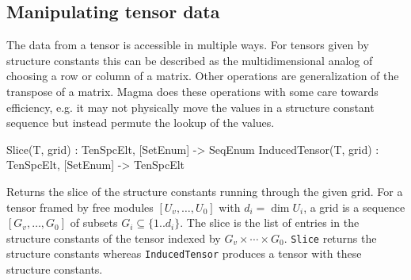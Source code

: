 \subsection{Manipulating tensor data}
The data from a tensor is accessible in multiple ways.   For 
tensors given by structure constants this can be described as the 
multidimensional analog of choosing a row or column of a matrix.
Other operations are generalization of the transpose of a matrix.
Magma does these operations with some care towards efficiency,
e.g. it may not physically move the values in a structure constant
sequence but instead permute the lookup of the values.


\begin{intrinsics}
Slice(T, grid) : TenSpcElt, [SetEnum] -> SeqEnum
InducedTensor(T, grid) : TenSpcElt, [SetEnum] -> TenSpcElt
\end{intrinsics}

Returns the slice of the structure constants running through the given grid. 
For a tensor framed by free modules $[U_v,\dots,U_0]$ with $d_i=\dim U_i$, 
a grid is a sequence $[G_v,\dots,G_0]$ of subsets $G_i\subseteq \{1..d_i\}$.
The slice is the list of entries in the structure constants of the tensor
indexed by $G_v\times \cdots \times G_0$. {\tt Slice} returns the structure
constants whereas {\tt InducedTensor} produces a tensor with these
structure constants. 

